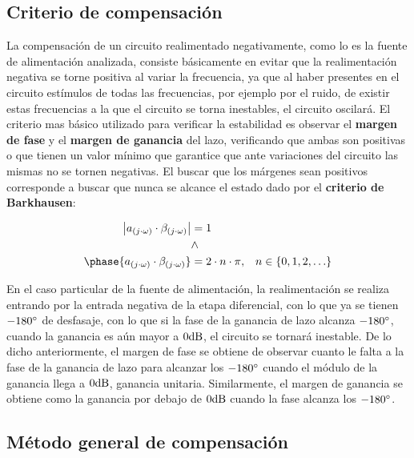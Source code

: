 
\subsection{Criterio de compensación}

La compensación de un circuito realimentado negativamente, como lo es la fuente de alimentación analizada, consiste básicamente en evitar que la realimentación negativa se torne positiva al variar la frecuencia, ya que al haber presentes en el circuito estímulos de todas las frecuencias, por ejemplo por el ruido, de existir estas frecuencias a la que el circuito se torna inestables, el circuito oscilará. El criterio mas básico utilizado para verificar la estabilidad es observar el \textbf{margen de fase} y el \textbf{margen de ganancia} del lazo, verificando que ambas son positivas o que tienen un valor mínimo que garantice que ante variaciones del circuito las mismas no se tornen negativas. El buscar que los márgenes sean positivos corresponde a buscar que nunca se alcance el estado dado por el \textbf{criterio de Barkhausen}:

\begin{align}
\begin{split}
\left| a_{(j \cdot \omega)} \cdot \beta_{(j \cdot \omega)} \right| &= 1 \\
& \land \\
\phase{a_{(j \cdot \omega)} \cdot \beta_{(j \cdot \omega)}} &= 2 \cdot n \cdot \pi,\;\;\; n \in \left \{  0, 1, 2, \ldots \right \} 
\end{split} 
\end{align}


En el caso particular de la fuente de alimentación, la realimentación se realiza entrando por la entrada negativa de la etapa diferencial, con lo que ya se tienen $-180 \si[per-mode=symbol]{\degree}$ de desfasaje, con lo que si la fase de la ganancia de lazo alcanza $-180 \si[per-mode=symbol]{\degree}$, cuando la ganancia es aún mayor a $0 \si[per-mode=symbol]{\decibel}$, el circuito se tornará inestable. De lo dicho anteriormente, el margen de fase se obtiene de observar cuanto le falta a la fase de la ganancia de lazo para alcanzar los $-180 \si[per-mode=symbol]{\degree}$  cuando el módulo de la ganancia llega a $0 \si[per-mode=symbol]{\decibel}$, ganancia unitaria. Similarmente, el margen de ganancia se obtiene como la ganancia por debajo de $0 \si[per-mode=symbol]{\decibel}$ cuando la fase alcanza los $-180 \si[per-mode=symbol]{\degree}$.


\subsection{Método general de compensación}

